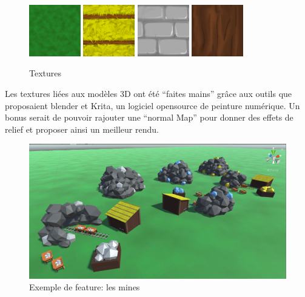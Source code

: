 \documentclass[12pt]{report}
\begin{document}
\begin{figure}[H]
    \centering
    \includegraphics[width=0.2\textwidth]{Plain_Tex}
    \includegraphics[width=0.2\textwidth]{StrawRoof}
    \includegraphics[width=0.2\textwidth]{Wall}
    \includegraphics[width=0.2\textwidth]{Wood}
    \caption{Textures}
\end{figure}

Les textures liées aux modèles 3D ont été “faites mains” grâce aux outils que proposaient blender et Krita, un logiciel opensource de peinture numérique. Un bonus serait de pouvoir rajouter une “normal Map” pour donner des effets de relief et proposer ainsi un meilleur rendu.

\begin{figure}[H]
    \centering
    \includegraphics[scale=0.8]{mines}
    \caption{Exemple de feature: les mines}
\end{figure}
\end{document}
